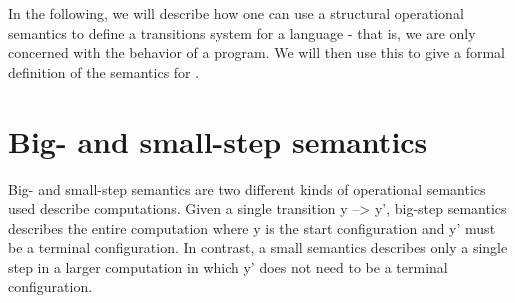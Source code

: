 In the following, we will describe how one can use a structural operational semantics to define a transitions system for a language - that is, we are only concerned with the behavior of a program.
We will then use this to give a formal definition of the semantics for \dazel{}.

\section{Big- and small-step semantics}
Big- and small-step semantics are two different kinds of operational semantics used describe computations.
Given a single transition y --> y', big-step semantics describes the entire computation where y is the start configuration and y' must be a terminal configuration. 
In contrast, a small semantics describes only a single step in a larger computation in which y' does not need to be a terminal configuration. 